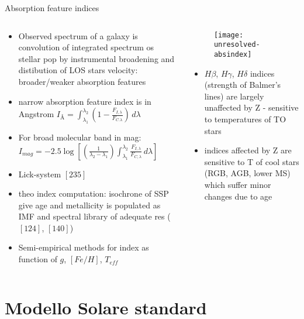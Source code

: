 \begin{frame}{Absorption feature indices}
\begin{columns}\begin{column}{0.5\textwidth}
\begin{itemize}
\item Observed spectrum of a galaxy is convolution of integrated spectrum os stellar pop by instrumental broadening and distibution of LOS stars velocity: broader/weaker absorption features
\item narrow absorption feature index is in Angstrom
    $I_{\si{\angstrom}}=\int_{\lambda_1}^{\lambda_2}(1-\frac{F_{I,\lambda}}{F_{C.\lambda}})\,d\lambda$
\item For broad molecular band in mag: $I_{mag}=-2.5\log{[(\frac{1}{\lambda_2-\lambda_1})\int_{\lambda_1}^{\lambda_2}\frac{F_{I,\lambda}}{F_{C,\lambda}}\,d\lambda]}$
\item Lick-system $[235]$
\item theo index computation: isochrone of SSP give age and metallicity is populated as IMF and spectral library of adequate res ($[124]$, $[140]$)
\item Semi-empirical methods for index as function of $g$, $[Fe/H]$, $T_{eff}$
\end{itemize} 
\end{column} \begin{column}{0.45\textwidth}
\begin{figure}[!ht]
\texttt{[image: unresolved-absindex]}
\end{figure}
\begin{itemize}
\item $H\beta$, $H\gamma$, $H\delta$ indices (strength of Balmer's lines) are largely unaffected by Z - sensitive to temperatures of TO stars
\item indices affected by Z are sensitive to T of cool stars (RGB, AGB, lower MS) which suffer minor changes due to age
\end{itemize}
\end{column}\end{columns}
\end{frame}

\section{Modello Solare standard}

